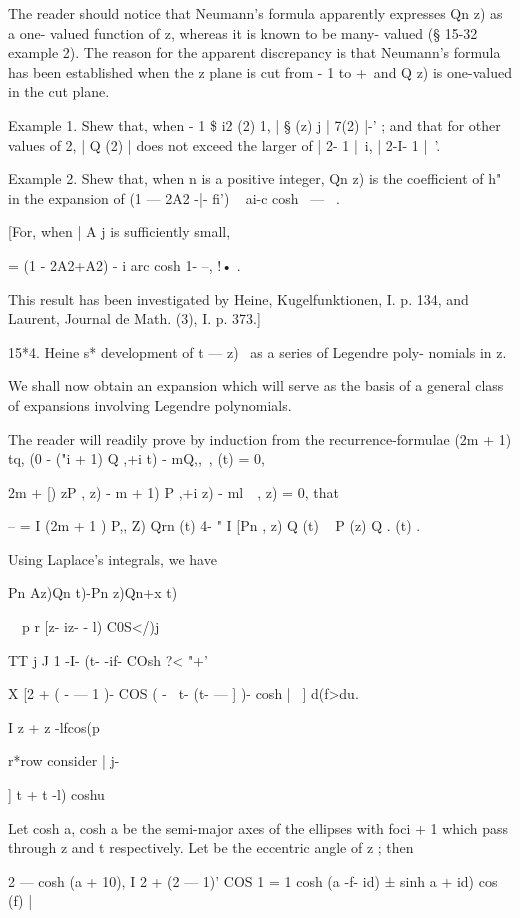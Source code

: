 {{{The reader should notice that Neumann's formula apparently expresses
Qn z) as a one- valued function of z, whereas it is known to be many-
valued (§ 15-32 example 2). The reason for the apparent discrepancy is
that Neumann's formula has been established when the z plane is cut
from - 1 to +\, and Q z) is one-valued in the cut plane.

Example 1. Shew that, when - 1 \$ i2 (2) 1, | § (z) j | 7(2) |-' ; and
that for other values of 2, | Q (2) | does not exceed the larger of |
2- 1 |~i, | 2-I- 1 |~'.

Example 2. Shew that, when n is a positive integer, Qn z) is the
coefficient of h" in the expansion of (1 — 2A2 -|- fi') ~ ai-c cosh \
— \ .

[For, when | A j is sufficiently small,

= (1 - 2A2+A2) - i arc cosh 1- --, !• .

This result has been investigated by Heine, Kugelfunktionen, I. p.
134, and Laurent, Journal de Math. (3), I. p. 373.]

15*4. Heine s* development of t — z)~ as a series of Legendre poly-
nomials in z.

We shall now obtain an expansion which will serve as the basis of a
general class of expansions involving Legendre polynomials.

The reader will readily prove by induction from the
recurrence-formulae (2m + 1) tq, (0 - ("i + 1) Q ,+i t) - mQ,,\ , (t)
= 0,

 2m + [) zP , z) - m + 1) P ,+i z) - ml\ \ , z) = 0, that

-- = I (2m + 1 ) P,, Z) Qrn (t) 4- " I [Pn , z) Q (t) ~ P (z) Q . (t)
.

Using Laplace's integrals, we have

Pn Az)Qn t)-Pn z)Qn+x t)

\ \ p r [z- iz- - l) C0S</)j

TT j J 1 -I- (t- -if- COsh ?< "+'

X [2 + ( - — 1 )- COS ( - \ t- (t- — ] )- cosh |~ ] d(f>du.

I z + z -lfcos(p

r*row consider | j-

] t + t -l) coshu

Let cosh a, cosh a be the semi-major axes of the ellipses with foci +
1 which pass through z and t respectively. Let be the eccentric angle
of z ; then

2 — cosh (a + 10), I 2 + (2 — 1)' COS 1 = 1 cosh (a -f- id) ± sinh a +
id) cos (f) |

}}}

